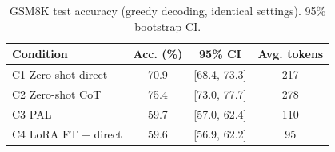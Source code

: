 \begin{table}[t]
\centering
\caption{GSM8K test accuracy (greedy decoding, identical settings). 95\% bootstrap CI.}
\label{tab:main}
\begin{tabular}{lccc}
\toprule
Condition & Acc. (\%) & 95\% CI & Avg. tokens \\
\midrule
C1 Zero-shot direct & 70.9 & [68.4, 73.3] & 217 \\
C2 Zero-shot CoT & 75.4 & [73.0, 77.7] & 278 \\
C3 PAL & 59.7 & [57.0, 62.4] & 110 \\
C4 LoRA FT + direct & 59.6 & [56.9, 62.2] & 95 \\
\bottomrule
\end{tabular}
\end{table}